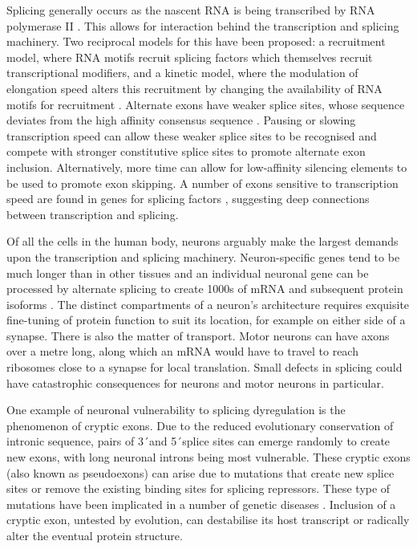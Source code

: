 Splicing generally occurs as the nascent RNA is being transcribed by RNA polymerase II \citep{Beyer1988,Ameur2011}.
This allows for interaction behind the transcription and splicing machinery.
Two reciprocal models for this have been proposed: a recruitment model, where RNA motifs recruit splicing factors which themselves recruit transcriptional modifiers, and a kinetic model, where the modulation of elongation speed alters this recruitment by changing the availability of RNA motifs for recruitment \citep{Kornblihtt2004a}.
Alternate exons have weaker splice sites, whose sequence deviates from the high affinity consensus sequence \citep{Stamm2000}.
Pausing or slowing transcription speed can allow these weaker splice sites to be recognised and compete with stronger constitutive splice sites to promote alternate exon inclusion.
Alternatively, more time can allow for low-affinity silencing elements to be used to promote exon skipping.
A number of exons sensitive to transcription speed are found in genes for splicing factors \citep{Ip2011}, suggesting deep connections between transcription and splicing. 

Of all the cells in the human body, neurons arguably make the largest demands upon the transcription and splicing machinery. Neuron-specific genes tend to be much longer than in other tissues \citep{Sibley2015} and an individual neuronal gene can be processed by alternate splicing to create 1000s of mRNA and subsequent protein isoforms \citep{Treutlein2014}. 
The distinct compartments of a neuron's architecture requires exquisite fine-tuning of protein function to suit its location, for example on either side of a synapse. 
There is also the matter of transport. 
Motor neurons can have axons over a metre long, along which an mRNA would have to travel to reach ribosomes close to a synapse for local translation. 
Small defects in splicing could have catastrophic consequences for neurons and motor neurons in particular. 

One example of neuronal vulnerability to splicing dyregulation is the phenomenon of cryptic exons.
Due to the reduced evolutionary conservation of intronic sequence, pairs of 3\'\ and 5\'\ splice sites can emerge randomly to create new exons, with long neuronal introns being most vulnerable. 
These cryptic exons (also known as pseudoexons) can arise due to mutations that create new splice sites or remove the existing binding sites for splicing repressors. 
These type of mutations have been implicated in a number of genetic diseases \citep{Eng2004-lq, Buratti2007-iz, Vorechovsky2006-wb,Meili2009-hc}. 
Inclusion of a cryptic exon, untested by evolution, can destabilise its host transcript or radically alter the eventual protein structure. 

